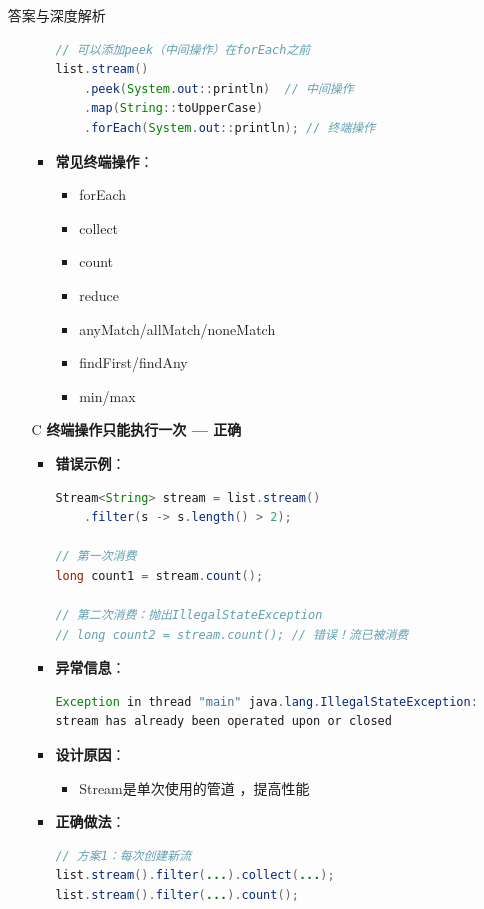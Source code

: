 \documentclass[12pt, a4paper]{ctexart}
\begin{document}
\begin{enumerate}[label=\textbf{\arabic*.}]
\begin{bluebox}{答案与深度解析}
\begin{itemize}[leftmargin=*, nosep, label={}]
\begin{itemize}[label={}, leftmargin=*, nosep]
\begin{lstlisting}[language=Java]
// 可以添加peek（中间操作）在forEach之前
list.stream()
    .peek(System.out::println)  // 中间操作
    .map(String::toUpperCase)
    .forEach(System.out::println); // 终端操作
				      \end{lstlisting}
				            \item \textbf{常见终端操作}：
				                  \begin{itemize}[label={}, nosep]
					                  \item forEach
					                  \item collect
					                  \item count
					                  \item reduce
					                  \item anyMatch/allMatch/noneMatch
					                  \item findFirst/findAny
					                  \item min/max
				                  \end{itemize}
			            \end{itemize}

			      \item[C] \textbf{终端操作只能执行一次 — 正确}
			            \begin{itemize}[label={}, leftmargin=*, nosep]
				            \item \textbf{错误示例}：
				                  \begin{lstlisting}[language=Java]
Stream<String> stream = list.stream()
    .filter(s -> s.length() > 2);

// 第一次消费
long count1 = stream.count();

// 第二次消费：抛出IllegalStateException
// long count2 = stream.count(); // 错误！流已被消费
				      \end{lstlisting}
				            \item \textbf{异常信息}：
				                  \begin{lstlisting}[language=Java]
Exception in thread "main" java.lang.IllegalStateException:
stream has already been operated upon or closed
				      \end{lstlisting}
				            \item \textbf{设计原因}：
				                  \begin{itemize}[label={}, nosep]
					                  \item Stream是单次使用的管道
					                        ，提高性能
				                  \end{itemize}
				            \item \textbf{正确做法}：
				                  \begin{lstlisting}[language=Java]
// 方案1：每次创建新流
list.stream().filter(...).collect(...);
list.stream().filter(...).count();


\end{lstlisting}
\end{itemize}
\end{itemize}
\end{bluebox}
\end{enumerate}
\end{document}
